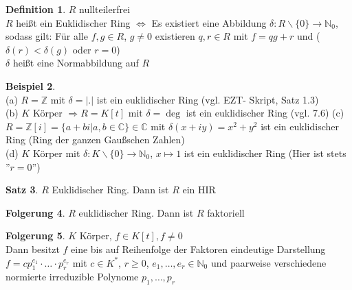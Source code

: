 \documentclass[10pt,a4paper,numbers=endperiod]{scrartcl}
\theoremstyle{definition}
\newtheorem{satz}{Satz}[section]
\newtheorem{defi}[satz]{Definition}
\newtheorem{bsp}[satz]{Beispiel}
\newtheorem{folg}[satz]{Folgerung}
\def\CC{{\mathbb C}}
\def\NN{{\mathbb N}}
\def\ZZ{{\mathbb Z}}
\begin{document}
\begin{defi}
	$R$ nullteilerfrei\\
	$R$ heißt ein Euklidischer Ring $\Leftrightarrow$ Es existiert eine Abbildung $\delta: R \backslash \{0\} \rightarrow \NN_0$, sodass gilt: Für alle $f, g \in R$, $g \neq 0$ existieren $q,r \in R$ mit $f = qg + r$ und ($\delta(r) < \delta(g)$ oder $r = 0$)\\
	$\delta$ heißt eine Normabbildung auf $R$
\end{defi}
	
\begin{bsp}
	$ $\\
	(a) $R = \ZZ$  mit $\delta = |.|$ ist ein euklidischer Ring (vgl. EZT- Skript, Satz 1.3)\\
	(b) $K$ Körper $\Rightarrow R = K[t]$ mit $\delta = \deg$ ist ein euklidischer Ring (vgl. 7.6)
	(c) $R = \ZZ[i] = \{a+bi|a,b \in \CC\} \in \CC$ mit $\delta(x+iy) = x^2 + y^2$ ist ein euklidischer Ring (Ring der ganzen Gaußschen Zahlen)\\
	(d) $K$ Körper mit $\delta: K \backslash \{0\} \rightarrow \NN_0$, $x \mapsto 1$ ist ein euklidischer Ring (Hier ist stets ''$r = 0$'')
\end{bsp}

\begin{satz}
	$R$ Euklidischer Ring. Dann ist $R$ ein HIR
\end{satz}

\begin{folg}
	$R$ euklidischer Ring. Dann ist $R$ faktoriell
\end{folg}

\begin{folg}
	$K$ Körper, $f \in K[t], f \neq 0$\\
	Dann besitzt $f$ eine bis auf Reihenfolge der Faktoren eindeutige Darstellung $f = cp_1^{e_1} \cdot \ldots \cdot p_r^{e_r}$ mit $c \in K^*$, $r \geq 0$, $e_1, \ldots, e_r \in \NN_0$ und paarweise verschiedene normierte irreduzible Polynome $p_1, \ldots, p_r$
\end{folg}
\end{document}
